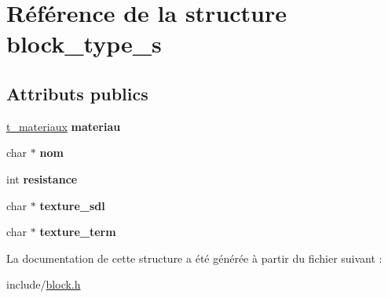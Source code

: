 \hypertarget{structblock__type__s}{}\section{Référence de la structure block\+\_\+type\+\_\+s}
\label{structblock__type__s}
\subsection*{Attributs publics}
\begin{DoxyCompactItemize}
\item 
\mbox{\label{structblock__type__s_a82611005fc1c350dc268ecfce3fdcb9a}} 
\hyperlink{block_8h_a4030ebe0eea609635f372f2e86d4332a}{t\+\_\+materiaux} {\bfseries materiau}
\item 
\mbox{\label{structblock__type__s_a24270b040acbfe41f41cd3a84ff75b3b}} 
char $\ast$ {\bfseries nom}
\item 
\mbox{\label{structblock__type__s_a71cd945de4cd58e1ab53bc0feb99acbc}} 
int {\bfseries resistance}
\item 
\mbox{\label{structblock__type__s_a7ceab5805caa0290e57b3a1e26a4d090}} 
char $\ast$ {\bfseries texture\+\_\+sdl}
\item 
\mbox{\label{structblock__type__s_a0018e7e74b665cfb61fea3546fcb0d1a}} 
char $\ast$ {\bfseries texture\+\_\+term}
\end{DoxyCompactItemize}


La documentation de cette structure a été générée à partir du fichier suivant \+:\begin{DoxyCompactItemize}
\item 
include/\hyperlink{block_8h}{block.\+h}\end{DoxyCompactItemize}

